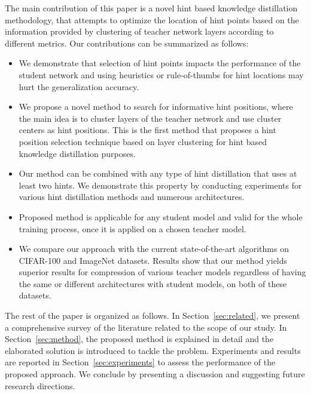 \documentclass[final,3p,times]{elsarticle}
\begin{document}
The main contribution of this paper is a novel hint based knowledge distillation methodology, that attempts to optimize the location of hint points based on the information provided by clustering of teacher network layers according to different metrics. Our contributions can be summarized as follows:
\begin{itemize}
  \item We demonstrate that selection of hint points impacts the performance of the student network and using heuristics or rule-of-thumbs for hint locations may hurt the generalization accuracy.
 
  \item We propose a novel method to search for informative hint positions, where the main idea is to cluster layers of the teacher network and use cluster centers as hint positions. This is the first method that proposes a hint position selection technique based on layer clustering for hint based knowledge distillation purposes.

  \item Our method can be combined with any type of hint distillation that uses at least two hints. We demonstrate this property by conducting experiments for various hint distillation methods and numerous architectures. 

  \item Proposed method is applicable for any student model and valid for the whole training process, once it is applied on a chosen teacher model. 

  \item We compare our approach with the current state-of-the-art algorithms on CIFAR-100 and ImageNet datasets. Results show that our method yields superior results for compression of various teacher models regardless of having the same or different architectures with student models, on both of these datasets.

\end{itemize}

The rest of the paper is organized as follows. In Section~\ref{sec:related}, we present a comprehensive survey of the literature related to the scope of our study. In Section~\ref{sec:method}, the proposed method is explained in detail and the elaborated solution is introduced to tackle the problem. Experiments and results are reported in Section~\ref{sec:experiments} to assess the performance of the proposed approach. We conclude by presenting a discussion and suggesting future research directions. 
\end{document}
